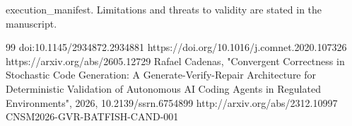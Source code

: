 \documentclass[conference]{IEEEtran}
\begin{document}
execution\_manifest. Limitations and threats to validity are stated in the manuscript.

\begin{thebibliography}{99}
 doi:10.1145/2934872.2934881
 https://doi.org/10.1016/j.comnet.2020.107326
 https://arxiv.org/abs/2605.12729
 Rafael Cadenas, "Convergent Correctness in Stochastic Code Generation: A Generate-Verify-Repair Architecture for Deterministic Validation of Autonomous AI Coding Agents in Regulated Environments", 2026, 10.2139/ssrn.6754899
 http://arxiv.org/abs/2312.10997
 CNSM2026-GVR-BATFISH-CAND-001
\end{thebibliography}
\end{document}
